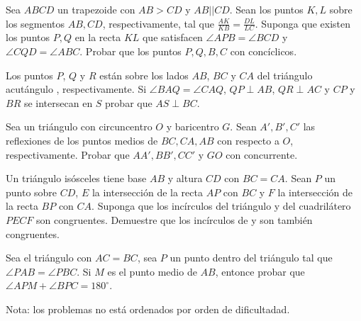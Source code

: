 \begin{section-problem}
    Sea $ABCD$ un trapezoide con $AB > CD$ y $AB || CD$.
    Sean los puntos $K, L$ sobre los segmentos $AB, CD$, respectivamente, tal que $\frac{AK}{KB} = \frac{DL}{LC}$.
    Suponga que existen los puntos $P, Q$ en la recta $KL$ que satisfacen $\angle APB = \angle BCD$ y $\angle CQD = \angle ABC$.
    Probar que los puntos $P, Q, B, C$ con concíclicos.
\end{section-problem}


\begin{section-problem}
    Los puntos $P$, $Q$ y $R$ están sobre los lados $AB$, $BC$ y $CA$ del triángulo acutángulo , respectivamente.
    Si $\angle BAQ = \angle CAQ$, $QP \perp AB$, $QR \perp AC$ y $CP$ y $BR$ se intersecan en $S$ probar que $AS \perp BC$.
\end{section-problem}

\begin{section-problem}
    Sea  un triángulo con circuncentro $O$ y baricentro $G$.
    Sean $A', B', C'$ las reflexiones de los puntos medios de $BC, CA, AB$ con respecto a $O$, respectivamente.
    Probar que $AA', BB', CC'$ y $GO$ con concurrente.
\end{section-problem}

\begin{section-problem}
    Un triángulo isósceles  tiene base $AB$ y altura $CD$ con $BC = CA$.
    Sean $P$ un punto sobre $CD$, $E$ la intersección de la recta $AP$ con $BC$ y $F$ la intersección de la recta $BP$ con $CA$.
    Suponga que los incírculos del triángulo  y del cuadrilátero $PECF$ son congruentes.
    Demuestre que los incírculos de  y  son también congruentes.
\end{section-problem}

\begin{section-problem}
    Sea el triángulo  con $AC = BC$, sea $P$ un punto dentro del triángulo tal que $\angle PAB = \angle PBC$.
    Si $M$ es el punto medio de $AB$, entonce probar que $\angle APM + \angle BPC = 180^{\circ}$.
\end{section-problem}

Nota: los problemas no está ordenados por orden de dificultadad.